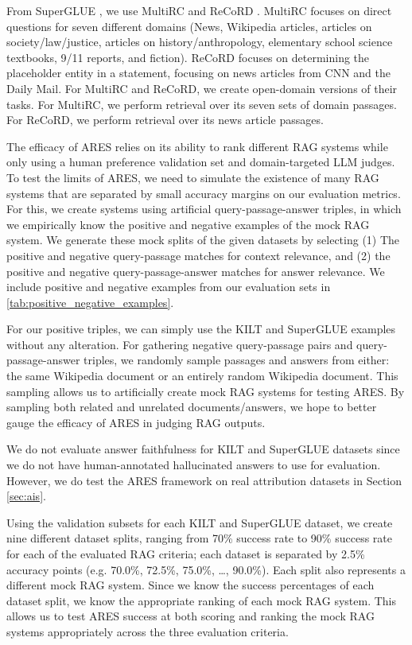 From SuperGLUE \cite{wang2019superglue}, we use  MultiRC and ReCoRD \cite{khashabi2018looking, zhang2018record}.
MultiRC focuses on direct questions for seven different domains (News, Wikipedia articles, articles on society/law/justice, articles on history/anthropology, elementary school science textbooks, 9/11 reports, and fiction).
ReCoRD focuses on determining the placeholder entity in a statement, focusing on news articles from CNN and the Daily Mail.
For MultiRC and ReCoRD, we create open-domain versions of their tasks. 
For MultiRC, we perform retrieval over its seven sets of domain passages. For ReCoRD, we perform retrieval over its news article passages.

The efficacy of ARES relies on its ability to rank different RAG systems while only using a human preference validation set and domain-targeted LLM judges.
To test the limits of ARES, we need to simulate the existence of many RAG systems that are separated by small accuracy margins on our evaluation metrics.
For this, we create systems using artificial query-passage-answer triples, in which we empirically know the positive and negative examples of the mock RAG system.
We generate these mock splits of the given datasets by selecting
(1) The positive and negative query-passage matches for context relevance, and
(2) the positive and negative query-passage-answer matches for answer relevance.
We include positive and negative examples from our evaluation sets in \autoref{tab:positive_negative_examples}.

For our positive triples, we can simply use the KILT and SuperGLUE examples without any alteration.
For gathering negative query-passage pairs and query-passage-answer triples, we randomly sample passages and answers from either: the same Wikipedia document or an entirely random Wikipedia document.
This sampling allows us to artificially create mock RAG systems for testing ARES.
By sampling both related and unrelated documents/answers, we hope to better gauge the efficacy of ARES in judging RAG outputs.

We do not evaluate answer faithfulness for KILT and SuperGLUE datasets since we do not have human-annotated hallucinated answers to use for evaluation. 
However, we do test the ARES framework on real attribution datasets in Section \ref{sec:ais}. 

Using the validation subsets for each KILT and SuperGLUE dataset, we create nine different dataset splits, ranging from 70\% success rate to 90\% success rate for each of the evaluated RAG criteria; each dataset is separated by 2.5\% accuracy points (e.g. 70.0\%, 72.5\%, 75.0\%, \ldots, 90.0\%).
Each split also represents a different mock RAG system.
Since we know the success percentages of each dataset split, we know the appropriate ranking of each mock RAG system.
This allows us to test ARES success at both scoring and ranking the mock RAG systems appropriately across the three evaluation criteria.

